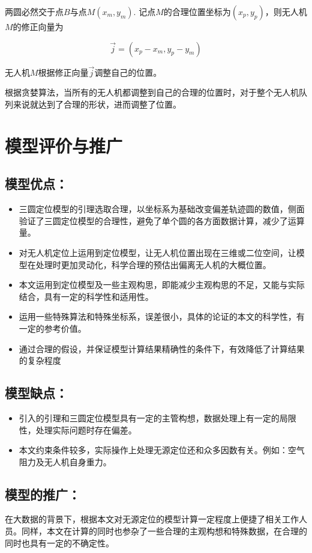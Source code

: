 两圆必然交于点$B$与点$M(x_m, y_m)$. 记点$M$的合理位置坐标为$(x_p, y_p)$，则无人机$M$的修正向量为

\begin{equation}
    \overrightarrow{j} = (x_p - x_m, y_p - y_m)
\end{equation}

无人机$M$根据修正向量$\overrightarrow{j}$调整自己的位置。

根据贪婪算法，当所有的无人机都调整到自己的合理的位置时，对于整个无人机队列来说就达到了合理的形状，进而调整了位置。


%


\section{模型评价与推广}

\subsection{模型优点：}

\begin{itemize}
    \item 三圆定位模型的引理选取合理，以坐标系为基础改变偏差轨迹圆的数值，侧面验证了三圆定位模型的合理性，避免了单个圆的各方面数据计算，减少了运算量。\cite{TongJiDaXueShuXueXiGaoDengShuXue}
    \item 对无人机定位上运用到定位模型，让无人机位置出现在三维或二位空间，让模型在处理时更加灵动化，科学合理的预估出偏离无人机的大概位置。
    \item 本文运用到定位模型及一些主观构思，即能减少主观构思的不足，又能与实际结合，具有一定的科学性和适用性。
    \item 运用一些特殊算法和特殊坐标系，误差很小，具体的论证的本文的科学性，有一定的参考价值。
    \item 通过合理的假设，并保证模型计算结果精确性的条件下，有效降低了计算结果的复杂程度
\end{itemize}

\subsection{模型缺点：}

\begin{itemize}
    \item 引入的引理和三圆定位模型具有一定的主管构想，数据处理上有一定的局限性，处理实际问题时存在偏差。
    \item 本文约束条件较多，实际操作上处理无源定位还和众多因数有关。例如：空气阻力及无人机自身重力。
\end{itemize}

\subsection{模型的推广：}

在大数据的背景下，根据本文对无源定位的模型计算一定程度上便捷了相关工作人员。同样，本文在计算的同时也参杂了一些合理的主观构想和特殊数据，在合理的同时也具有一定的不确定性。

